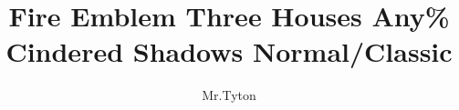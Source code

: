 \documentclass[a4paper]{report}
\title{Fire Emblem Three Houses Any\% Cindered Shadows Normal/Classic}
\author{Mr.Tyton}
\begin{document}
\singlespacing
\maketitle
\tableofcontents
\makeatletter
\patchcmd{\chapter}{\if@openright\cleardoublepage\else\clearpage\fi}{}{}{}
\makeatother


\newenvironment{battlespecial}[1]{\begin{tcolorbox}[title=\begin{center}#1\end{center},colbacktitle=red!50!white]}{\end{tcolorbox}}
\newenvironment{battle}[1]{\refstepcounter{chaptercount} \begin{tcolorbox}[title=\begin{center}Chapter \thechaptercount\ - #1\end{center},colbacktitle=red!50!white]}{\end{tcolorbox}}


\newcommand{\battleinfo}[3]{Goal: \ifthenelse{\equal{#1}{rout}}{Rout the Enemy}{\ifthenelse{\equal{#1}{commander}}{Defeat the Commander}{#1}} \newline Turns: #2 \newline Units: #3}

\newenvironment{shop}[1]{\begin{tcolorbox}[title=\begin{center}SHOP\, #1 GOLD\end{center},colbacktitle=OliveGreen!50!white]}{\end{tcolorbox}}

\newcommand{\cs}[1][]{\textbf{CS}%
	\ifthenelse{\isempty{#1}}{}{ (#1)}%
}

\newcommand{\down}{\textbf{$\downarrow$}}
\newcommand{\abutton}{\textbf{A}}
\newcommand{\bbutton}{\textbf{B}}

\newcommand{\autoInstruct}{\textbf{Auto-Instruct}}


\newcommand{\createCharacter}[2]{%
\expandafter\newcommand\csname #1\endcsname{\textbf{\textcolor[RGB]{#2}{#1}}} %
\expandafter\newcommand\csname #1f\endcsname{\item \textbf{\textcolor[RGB]{#2}{#1}}:}
}
\end{document}
